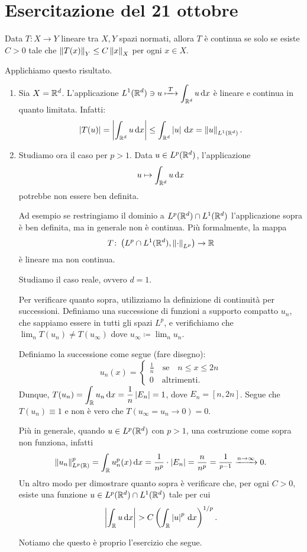 %
%

\section{Esercitazione del 21 ottobre}


Data $T \colon X \to Y$ lineare tra $X,Y$ spazi normati, allora $T$ è continua se solo se esiste  $C > 0$ tale che $\left\lVert T(x) \right\rVert_Y \leq C \left\lVert x \right\rVert_X$ per ogni $x \in X$.

Applichiamo questo risultato.

\begin{enumerate}
\item Sia $X = \mathbb R^d$. L'applicazione $\displaystyle L^1(\mathbb R^d) \ni u \xmapsto{\; T \;} \int_{\mathbb R^d} u \,\mathrm{d} x$ è lineare e continua in quanto limitata. Infatti:
%
$$
\left| T(u) \right| = \left| \int_{\mathbb R^d} u \,\mathrm{d} x  \right| \leq \int_{\mathbb R^d} \left| u \right| \,\mathrm{d} x = \left\lVert u \right\rVert_{L^1(\mathbb R^d)}.
$$
%

\item Studiamo ora il caso per $p > 1$. Data $u \in L^p(\mathbb R^d)$, l'applicazione
%
$$
u \mapsto \int_{\mathbb R^d} u \,\mathrm{d} x 
$$
%
potrebbe non essere ben definita.

Ad esempio se restringiamo il dominio a $L^p(\mathbb R^d) \cap L^1(\mathbb R^d)$ l'applicazione sopra è ben definita, ma in generale non è continua.
Più formalmente, la mappa
%
$$
T \colon \left( L^p \cap L^1(\mathbb R^d), \left\lVert \cdot \right\rVert_{L^p} \right) \to \mathbb R
$$
%
è lineare ma non continua.

Studiamo il caso reale, ovvero $d = 1$.

Per verificare quanto sopra, utilizziamo la definizione di continuità per successioni.
Definiamo una successione di funzioni a supporto compatto $u_n$, che sappiamo essere in tutti gli spazi $L^p$, e verifichiamo che $\lim_n T(u_n) \neq T(u_\infty)$ dove $u_\infty \coloneqq \lim_n u_n$.

Definiamo la successione come segue (fare disegno):
%
$$
u_n (x) =
\begin{cases}
\frac{1}{n} \quad \text{se} \quad n \leq x \leq 2n \\
0 \quad \text{altrimenti}. 
\end{cases} 
$$
%
Dunque, $\displaystyle T(u_n) = \int_{\mathbb R} u_n \,\mathrm{d} x = \frac{1}{n} \left| E_n \right| = 1$, dove $E_n = [n,2n]$.
Segue che $T(u_n) \equiv 1$ e non è vero che $T(u_\infty = u_n \to 0) = 0$.

Più in generale, quando $u \in L^p(\mathbb R^d)$ con $p > 1$, una costruzione come sopra non funziona, infatti
%
$$
\left\lVert u_n \right\rVert_{L^p(\mathbb R)}^p = \int_{\mathbb R} u_n^p(x) \,\mathrm{d} x = \frac{1}{n^p} \cdot \left| E_n \right| = \frac{n}{n^p} = \frac{1}{^{p-1}} \xrightarrow{n \to \infty} 0.
$$
%                    
Un altro modo per dimostrare quanto sopra è verificare che, per ogni $C > 0$, esiste una funzione $u \in L^p(\mathbb R^d) \cap L^1(\mathbb R^d)$ tale per cui 
%
$$
\left| \int_{\mathbb R} u \,\mathrm{d} x  \right| > C \left( \int_{\mathbb R} \left| u \right|^p \,\mathrm{d} x  \right)^{1/p}.
$$
%

Notiamo che questo è proprio l'esercizio che segue.

\end{enumerate}


